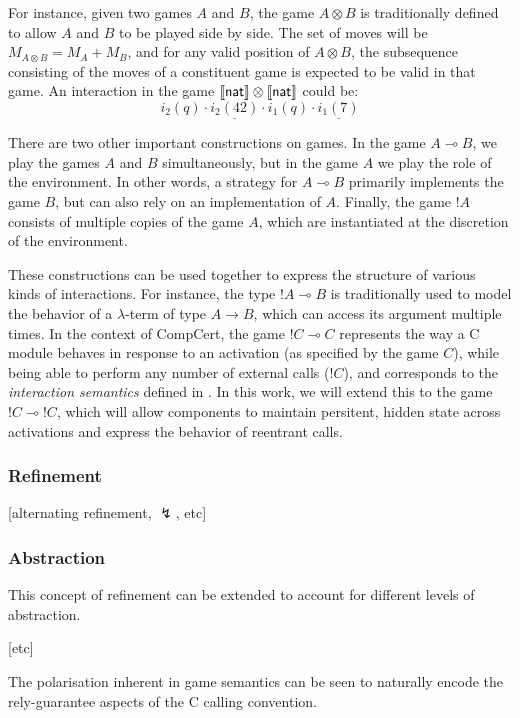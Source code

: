 For instance,
given two games $A$ and $B$,
the game $A \otimes B$ is traditionally defined
to allow $A$ and $B$ to be played side by side.
The set of moves will be $M_{A \otimes B} = M_A + M_B$,
and for any valid position of $A \otimes B$,
the subsequence consisting of the moves of a constituent game
is expected to be valid in that game.
An interaction in the game
$\llbracket  \mathsf{nat}  \rrbracket \otimes
 \llbracket  \mathsf{nat}  \rrbracket$ could be:
\[ i_2(q) \cdot \underline{i_2(42)} \cdot
   i_1(q) \cdot \underline{i_1(7)} \]

There are two other important constructions on games.
In the game $A \multimap B$,
we play the games $A$ and $B$ simultaneously,
but in the game $A$ we play the role of the environment.
In other words,
a strategy for $A \multimap B$
primarily implements the game $B$,
but can also rely on an implementation of $A$.
Finally,
the game $!A$
consists of multiple copies of the game $A$,
which are instantiated at the discretion of the environment.

These constructions can be used together
to express the structure of various kinds of interactions.
For instance,
the type $!A \multimap B$ is traditionally used
to model the behavior of a $\lambda$-term of type $A \rightarrow B$,
which can access its argument multiple times.
In the context of CompCert,
the game $!C \multimap C$
represents the way a C module behaves in response to an activation
(as specified by the game $C$),
while being able to perform any number of external calls ($!C$),
and corresponds to the \emph{interaction semantics} defined in
\cite{compcompcert}.
In this work,
we will extend this to the game $!C \multimap !C$,
which will allow components to maintain
persitent, hidden state across activations
and express the behavior of reentrant calls.

\subsubsection{Refinement}

[alternating refinement, $\lightning$, etc]

\subsubsection{Abstraction}

This concept of refinement can be extended to account for
different levels of abstraction.


[etc]

The polarisation inherent in game semantics
can be seen to naturally encode the rely-guarantee aspects
of the C calling convention.

